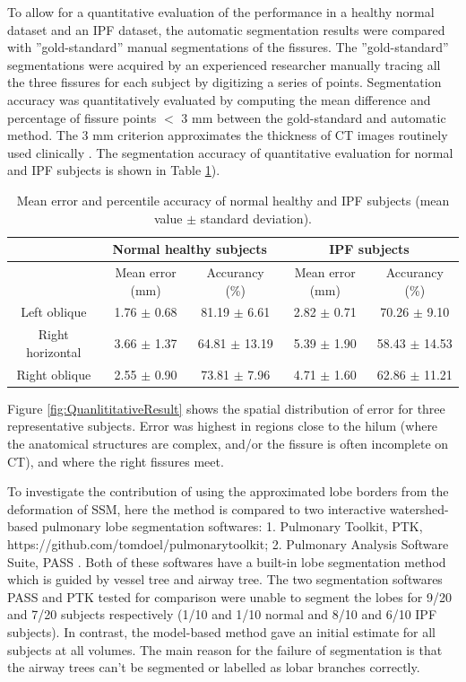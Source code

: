 \documentclass[]{spie}  %
\begin{document}
{To allow for a quantitative evaluation of the performance in a healthy normal dataset and an IPF dataset, the automatic segmentation results were compared with ''gold-standard'' manual segmentations of the fissures. The ''gold-standard'' segmentations were acquired by an experienced researcher manually tracing all the three fissures for each subject by digitizing a series of points. Segmentation accuracy was quantitatively evaluated by computing the mean difference and percentage of fissure points $<$ 3 mm between the gold-standard and automatic method. The 3 mm criterion approximates the thickness of CT images routinely used clinically \cite{wei2009segmentation}. The segmentation accuracy of quantitative evaluation for normal and IPF subjects is shown in Table \ref{tab:QuantitativeResult}).

\begin{table}[htbp]
\centering
\caption{Mean error and percentile accuracy of normal healthy and IPF subjects (mean value $\pm$ standard deviation).}
\label{tab:QuantitativeResult}
\begin{tabular}{| c | c | c | c | c |}
\hline
~ & \multicolumn{2}{|c|}{\bf{Normal healthy subjects}} & \multicolumn{2}{|c|}{\bf{IPF subjects}}\\ 
\hline
~ & Mean error (mm) & Accurancy (\%) & Mean error (mm) & Accurancy (\%)\\	
\hline
Left oblique & 1.76 $\pm$ 0.68 & 81.19 $\pm$ 6.61 & 2.82 $\pm$ 0.71 & 70.26 $\pm$ 9.10\\
\hline
Right horizontal & 3.66 $\pm$ 1.37 & 64.81 $\pm$ 13.19 & 5.39 $\pm$ 1.90 & 58.43 $\pm$ 14.53\\
\hline
Right oblique & 2.55 $\pm$ 0.90 & 73.81 $\pm$ 7.96 & 4.71 $\pm$ 1.60 & 62.86 $\pm$ 11.21\\						
\hline
\end{tabular}
\end{table}

Figure \ref{fig:QuanlititativeResult} shows the spatial distribution of error for three representative subjects. Error was highest in regions close to the hilum (where the anatomical structures are complex, and/or the fissure is often incomplete on CT), and where the right fissures meet. 

To investigate the contribution of using the approximated lobe borders from the deformation of SSM, here the method is compared to two interactive watershed-based pulmonary lobe segmentation softwares: 1. Pulmonary Toolkit, PTK, https://github.com/tomdoel/pulmonarytoolkit; 2. Pulmonary Analysis Software Suite, PASS \cite{guo2008pulmonary}. Both of these softwares have a built-in lobe segmentation method which is guided by vessel tree and airway tree. The two segmentation softwares PASS and PTK tested for comparison were unable to segment the lobes for 9/20 and 7/20 subjects respectively (1/10 and 1/10 normal and 8/10 and 6/10 IPF subjects). In contrast, the model-based method gave an initial estimate for all subjects at all volumes. The main reason for the failure of segmentation is that the airway trees can't be segmented or labelled as lobar branches correctly.

}
\end{document}
